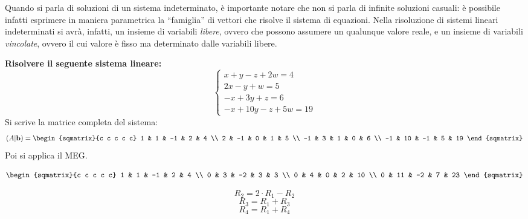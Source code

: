 Quando si parla di soluzioni di un sistema indeterminato, è importante notare che non si parla di infinite soluzioni casuali: è possibile infatti esprimere in maniera parametrica la ``famiglia'' di vettori che risolve il sistema di equazioni. Nella risoluzione di sistemi lineari indeterminati si avrà, infatti, un insieme di variabili \textit{libere}, ovvero che possono assumere un qualunque valore reale, e un insieme di variabili \textit{vincolate}, ovvero il cui valore è fisso ma determinato dalle variabili libere.

\begin{esempio}
    \textbf{Risolvere il seguente sistema lineare:}
    \[
        \begin{cases}
            x + y - z + 2w = 4 \\
            2x -y + w = 5 \\
            -x + 3y + z = 6 \\
            -x + 10y - z + 5w = 19
        \end{cases}
    \]
    Si scrive la matrice completa del sistema:
    \[
        (A|\textbf{b}) =
        \begin{sqmatrix}{c c c c c}
            1 & 1 & -1 & 2 & 4 \\
            2 & -1 & 0 & 1 & 5 \\
            -1 & 3 & 1 & 0 & 6 \\
            -1 & 10 & -1 & 5 & 19
        \end{sqmatrix}
    \]
    Poi si applica il MEG.
    \begin{center}
        \begin{minipage}{.4\textwidth}
            \[
                \begin{sqmatrix}{c c c c c}
                    1 & 1 & -1 & 2 & 4 \\
                    0 & 3 & -2 & 3 & 3 \\
                    0 & 4 & 0 & 2 & 10 \\
                    0 & 11 & -2 & 7 & 23
                \end{sqmatrix}
            \]
        \end{minipage}
        \begin{minipage}{.4\textwidth}
            \[
                R_2 = 2 \cdot R_1 - R_2
            \]
            \[
                R_3 = R_1 + R_3
            \]
            \[
                R_4 = R_1 + R_4
            \]
        \end{minipage}
    \end{center}

\end{esempio}
